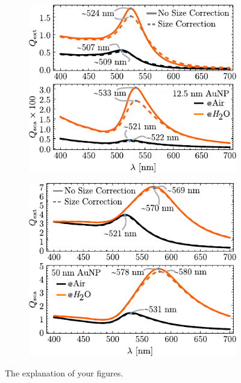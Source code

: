 %
\begin{figure}[h!]\centering
	\begin{subfigure}{.05\textwidth}\caption{}\label{sfig:secondary1}\vspace*{5.5cm}\end{subfigure}
	\hspace*{-2.em}
	\begin{subfigure}{.48\textwidth} \includegraphics[scale = 1.02]{1-Theory/figs/QextQsca_12-5.pdf}\end{subfigure}
	\hspace*{-.5em}\begin{subfigure}{.05\textwidth}\vspace{-5.5cm}\caption{}\label{sfig:secondaty2}	\end{subfigure}
	\hspace*{-2.em}
	\begin{subfigure}{.48\textwidth} \includegraphics[scale = 1.02]{1-Theory/figs/QextQsca_50.pdf}\end{subfigure}%
\vspace*{-.5em}
\caption[Example of Figure title]{The explanation of your figures. \blindtext}	\label{fig:Main}	
\end{figure}	
				
